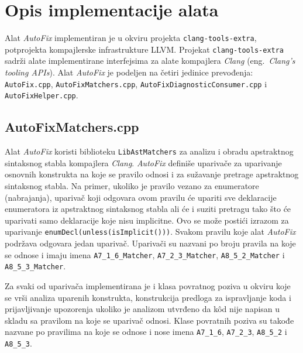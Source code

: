 \documentclass[12pt,oneside]{memoir}
\begin{document}
\section{Opis implementacije alata}

Alat \textit{AutoFix} implementiran je u okviru projekta \texttt{clang-tools-extra}, potprojekta kompajlerske infrastrukture LLVM. Projekat \texttt{clang-tools-extra} sadr\v{z}i alate implementirane interfejsima za alate kompajlera \textit{Clang} (eng.~\textit{Clang’s tooling APIs}).
Alat \textit{AutoFix} je podeljen na \v{c}etiri jedinice prevođenja: \texttt{AutoFix.cpp}, \texttt{AutoFix\-Matchers.cpp}, \texttt{AutoFixDiagnosticConsumer.cpp} i \texttt{AutoFixHelper.cpp}.

\subsection{AutoFixMatchers.cpp}
Alat \textit{AutoFix} koristi biblioteku \texttt{LibAstMatchers} za analizu i obradu apstraktnog sintaksnog stabla kompajlera \textit{Clang}. 
\textit{AutoFix} defini\v{s}e upariva\v{c}e za uparivanje osnovnih konstrukta na koje se pravilo odnosi i za su\v{z}avanje pretrage apstraktnog sintaksnog stabla. Na primer, ukoliko je pravilo vezano za enumeratore (nabrajanja), upariva\v{c} koji odgovara ovom pravilu \'{c}e upariti sve deklaracije enumeratora iz apstraktnog sintaksnog stabla ali \'{c}e i suziti pretragu tako \v{s}to \'{c}e uparivati samo deklaracije koje nisu implicitne. Ovo se mo\v{z}e posti\'{c}i izrazom za uparivanje \texttt{enumDecl(unless(isImplicit()))}. Svakom pravilu koje alat \textit{AutoFix} podr\v{z}ava odgovara jedan upariva\v{c}. Upariva\v{c}i su nazvani po broju pravila na koje se odnose i imaju imena
\texttt{A7\_1\_6\_Matcher}, \texttt{A7\_2\_3\_Matcher}, \texttt{A8\_5\_2\_Matcher} i \texttt{A8\_5\_3\_Matcher}.
\par
 Za svaki od upariva\v{c}a implementirana je i klasa povratnog poziva u okviru koje se vr\v{s}i analiza uparenih konstrukta, konstrukcija predloga za ispravljanje koda i prijavljivanje upozorenja ukoliko je analizom utvrđeno da k\^{o}d nije napisan u skladu sa pravilom na koje se upariva\v{c} odnosi. Klase
 povratnih poziva su takođe nazvane po pravilima na koje se odnose i nose imena \texttt{A7\_1\_6}, \texttt{A7\_2\_3}, \texttt{A8\_5\_2} i \texttt{A8\_5\_3}.
\end{document}
